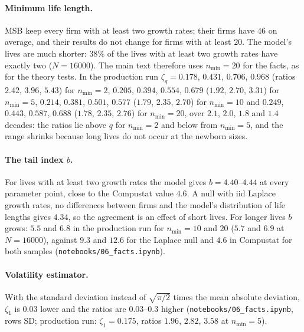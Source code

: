 \documentclass[pre,onecolumn,superscriptaddress,nofootinbib]{revtex4-2}
\begin{document}
\paragraph{Minimum life length.}  MSB keep every firm with at least two growth rates; their firms have $46$ on
average, and their results do not change for firms with at least $20$.  The model's lives are much shorter:
$38\%$ of the lives with at least two growth rates have exactly two ($N=16000$).  The main text therefore uses
$n_{\min}=20$ for the facts, as for the theory tests.  In the production run $\zeta_q=0.178$, $0.431$, $0.706$, $0.968$
(ratios $2.42$, $3.96$, $5.43$) for $n_{\min}=2$, $0.205$, $0.394$, $0.554$, $0.679$ ($1.92$, $2.70$, $3.31$) for $n_{\min}=5$,
$0.214$, $0.381$, $0.501$, $0.577$ ($1.79$, $2.35$, $2.70$) for $n_{\min}=10$ and $0.249$, $0.443$, $0.587$, $0.688$ ($1.78$, $2.35$,
$2.76$) for $n_{\min}=20$, over $2.1$, $2.0$, $1.8$ and $1.4$ decades: the ratios lie above $q$ for $n_{\min}=2$ and below
from $n_{\min}=5$, and the range shrinks because long lives do not occur at the newborn sizes.

\paragraph{The tail index $b$.}  For lives with at least two growth rates the model gives
$b=4.40$--$4.44$ at every parameter point, close to the Compustat value $4.6$.  A null with iid Laplace
growth rates, no differences between firms and the model's distribution of life lengths gives
$4.34$, so the agreement is an effect of short lives.  For longer lives $b$ grows: $5.5$ and $6.8$ in the production
run for $n_{\min}=10$ and $20$ ($5.7$ and $6.9$ at $N=16000$), against $9.3$ and $12.6$ for the Laplace null and $4.6$ in
Compustat for both samples (\texttt{notebooks/06\_facts.ipynb}).

\paragraph{Volatility estimator.}  With the standard deviation instead of $\sqrt{\pi/2}$ times the mean
absolute deviation, $\zeta_1$ is $0.03$ lower and the ratios are $0.03$--$0.3$ higher (\texttt{notebooks/06\_facts.ipynb},
rows SD; production run: $\zeta_1=0.175$, ratios $1.96$, $2.82$, $3.58$ at $n_{\min}=5$).


\end{document}
